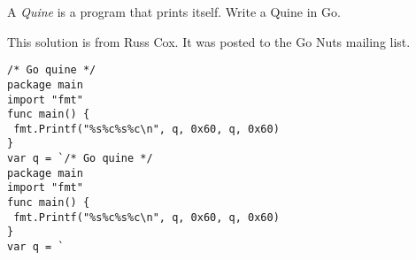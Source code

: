 \begin{Exercise}[title={Quine},difficulty=2]
A \emph{Quine} is a program that prints itself.
\label{ex:quine}
\Question\label{ex:quine q1} Write a Quine in Go.
\end{Exercise}

\begin{Answer}
\begin{lbar}
This solution is from Russ Cox. It was posted to 
the Go Nuts mailing list.
\end{lbar}
\Question 
\begin{lstlisting}[caption=A Go quine]
/* Go quine */
package main
import "fmt"
func main() {
 fmt.Printf("%s%c%s%c\n", q, 0x60, q, 0x60)
}
var q = `/* Go quine */
package main
import "fmt"
func main() {
 fmt.Printf("%s%c%s%c\n", q, 0x60, q, 0x60)
}
var q = `
\end{lstlisting}
\end{Answer}
